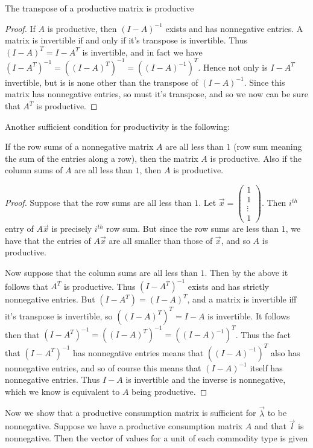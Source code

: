 \begin{theorem}
	The transpose of a productive matrix is productive
\end{theorem}
\begin{proof}
	If $A$ is productive, then $(I-A)^{-1}$ exists and has nonnegative entries. A matrix is invertible if and only if it's transpose is invertible. Thus $(I-A)^T = I-A^T$ is invertible, and in fact we have $(I-A^T)^{-1} = ((I-A)^T)^{-1} = ((I-A)^{-1})^T$. Hence not only is $I-A^T$ invertible, but is is none other than the transpose of $(I-A)^{-1}$. Since this matrix has nonnegative entries, so must it's transpose, and so we now can be sure that $A^T$ is productive. 
\end{proof}
Another sufficient condition for productivity is the following:
\begin{theorem}
	If the row sums of a nonnegative matrix $A$ are all less than $1$ (row sum meaning the sum of the entries along a row), then the matrix $A$ is productive. Also if the column sums of $A$ are all less than $1$, then $A$ is productive.
\end{theorem} 
\begin{proof}
	Suppose that the row sums are all less than $1$. Let $\vec{x} = \begin{pmatrix} 1 \\ 1 \\ \vdots \\ 1 \end{pmatrix}$. Then $i^{th}$ entry of $A\vec{x}$ is precisely $i^{th}$ row sum. But since the row sums are less than $1$, we have that the entries of $A\vec{x}$ are all smaller than those of $\vec{x}$, and so $A$ is productive. \par 
	Now suppose that the column sums are all less than $1$. Then by the above it follows that $A^T$ is productive. Thus $(I-A^T)^{-1}$ exists and has strictly nonnegative entries. But $(I-A^T) = (I-A)^T$, and a matrix is invertible iff it's transpose is invertible, so $((I-A)^T)^T = I-A$ is invertible. It follows then that $(I-A^T)^{-1} = ((I-A)^T)^{-1} = ((I-A)^{-1})^T$. Thus the fact that $(I-A^T)^{-1}$ has nonnegative entries means that $((I-A)^{-1})^T$ also has nonnegative entries, and so of course this means that $(I-A)^{-1}$ itself has nonnegative entries. Thus $I-A$ is invertible and the inverse is nonnegative, which we know is equivalent to $A$ being productive. 
\end{proof}
 Now we show that a productive consumption matrix is sufficient for $\vec{\lambda}$ to be nonnegative. Suppose we have a productive consumption matrix $A$ and that $\vec{l}$ is nonnegative. Then the vector of values for a unit of each commodity type is given
